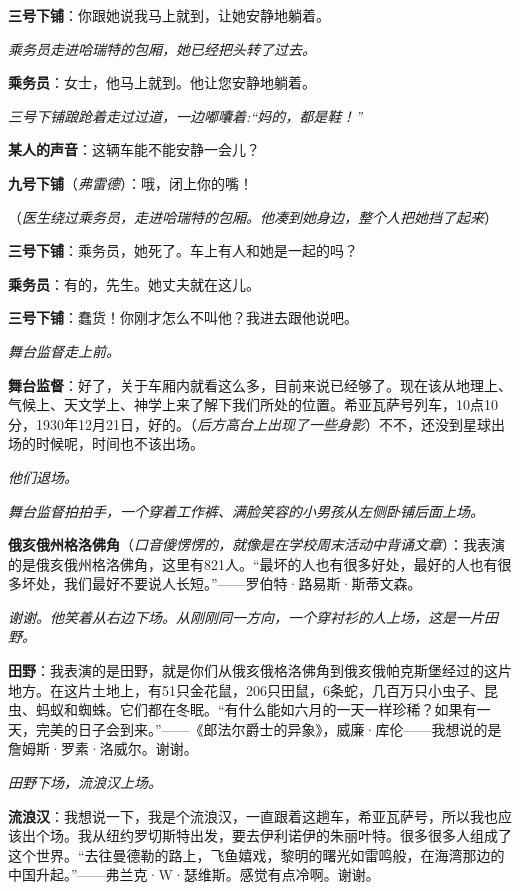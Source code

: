 \documentclass[lang=cn,newtx,12pt,scheme=chinese]{elegantbook}
\begin{document}
\textbf{三号下铺}：你跟她说我马上就到，让她安静地躺着。

\textit{乘务员走进哈瑞特的包厢，她已经把头转了过去。}

\textbf{乘务员}：女士，他马上就到。他让您安静地躺着。

\textit{三号下铺踉跄着走过过道，一边嘟囔着:“妈的，都是鞋！”}

\textbf{某人的声音}：这辆车能不能安静一会儿？

\textbf{九号下铺}（\textit{弗雷德}）：哦，闭上你的嘴！

（\textit{医生绕过乘务员，走进哈瑞特的包厢。他凑到她身边，整个人把她挡了起来}）

\textbf{三号下铺}：乘务员，她死了。车上有人和她是一起的吗？

\textbf{乘务员}：有的，先生。她丈夫就在这儿。

\textbf{三号下铺}：蠢货！你刚才怎么不叫他？我进去跟他说吧。

\textit{舞台监督走上前。}

\textbf{舞台监督}：好了，关于车厢内就看这么多，目前来说已经够了。现在该从地理上、气候上、天文学上、神学上来了解下我们所处的位置。希亚瓦萨号列车，10点10分，1930年12月21日，好的。（\textit{后方高台上出现了一些身影}）不不，还没到星球出场的时候呢，时间也不该出场。

\textit{他们退场。}

\textit{舞台监督拍拍手，一个穿着工作裤、满脸笑容的小男孩从左侧卧铺后面上场。}

\textbf{俄亥俄州格洛佛角}（\textit{口音傻愣愣的，就像是在学校周末活动中背诵文章}）：我表演的是俄亥俄州格洛佛角，这里有821人。“最坏的人也有很多好处，最好的人也有很多坏处，我们最好不要说人长短。”——罗伯特·路易斯·斯蒂文森。

\textit{谢谢。他笑着从右边下场。从刚刚同一方向，一个穿衬衫的人上场，这是一片田野。}

\textbf{田野}：我表演的是田野，就是你们从俄亥俄格洛佛角到俄亥俄帕克斯堡经过的这片地方。在这片土地上，有51只金花鼠，206只田鼠，6条蛇，几百万只小虫子、昆虫、蚂蚁和蜘蛛。它们都在冬眠。“有什么能如六月的一天一样珍稀？如果有一天，完美的日子会到来。”——《郎法尔爵士的异象》，威廉·库伦——我想说的是詹姆斯·罗素·洛威尔。谢谢。

\textit{田野下场，流浪汉上场。}

\textbf{流浪汉}：我想说一下，我是个流浪汉，一直跟着这趟车，希亚瓦萨号，所以我也应该出个场。我从纽约罗切斯特出发，要去伊利诺伊的朱丽叶特。很多很多人组成了这个世界。“去往曼德勒的路上，飞鱼嬉戏，黎明的曙光如雷鸣般，在海湾那边的中国升起。”——弗兰克·W·瑟维斯。感觉有点冷啊。谢谢。
\end{document}
